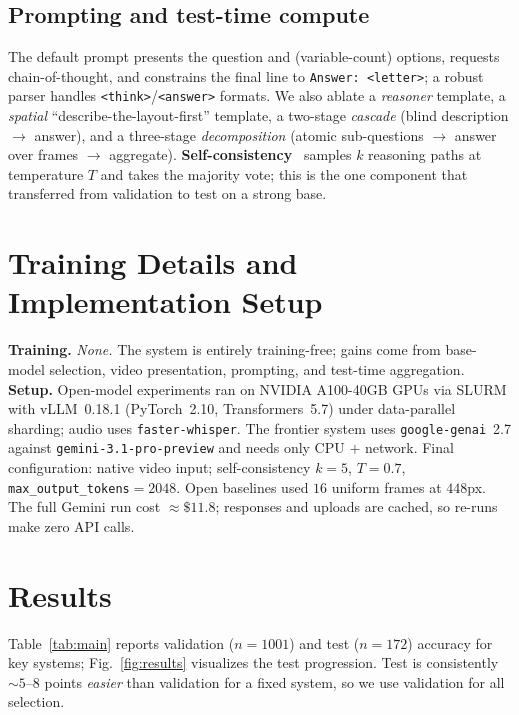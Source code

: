 \documentclass[10pt,twocolumn,letterpaper]{article}
\begin{document}
\subsection{Prompting and test-time compute}
The default prompt presents the question and (variable-count) options, requests chain-of-thought, and
constrains the final line to \texttt{Answer: <letter>}; a robust parser handles
\texttt{<think>}/\texttt{<answer>} formats. We also ablate a \emph{reasoner} template, a \emph{spatial}
``describe-the-layout-first'' template, a two-stage \emph{cascade} (blind description $\rightarrow$
answer), and a three-stage \emph{decomposition} (atomic sub-questions $\rightarrow$ answer over frames
$\rightarrow$ aggregate). \textbf{Self-consistency}~\cite{selfconsistency} samples $k$ reasoning paths
at temperature $T$ and takes the majority vote; this is the one component that transferred from
validation to test on a strong base.

\section{Training Details and Implementation Setup}
\textbf{Training.} \emph{None.} The system is entirely training-free; gains come from base-model
selection, video presentation, prompting, and test-time aggregation. \textbf{Setup.} Open-model
experiments ran on NVIDIA A100-40GB GPUs via SLURM with vLLM~0.18.1 (PyTorch~2.10, Transformers~5.7)
under data-parallel sharding; audio uses \texttt{faster-whisper}. The frontier system uses
\texttt{google-genai}~2.7 against \texttt{gemini-3.1-pro-preview} and needs only CPU $+$ network.
Final configuration: native video input; self-consistency $k{=}5$, $T{=}0.7$,
\texttt{max\_output\_tokens}$=2048$. Open baselines used $16$ uniform frames at $448$px. The full
Gemini run cost ${\approx}\$11.8$; responses and uploads are cached, so re-runs make zero API calls.

\section{Results}
Table~\ref{tab:main} reports validation ($n{=}1001$) and test ($n{=}172$) accuracy for key systems;
Fig.~\ref{fig:results} visualizes the test progression. Test is consistently $\sim$$5$--$8$ points
\emph{easier} than validation for a fixed system, so we use validation for all selection.
\end{document}
